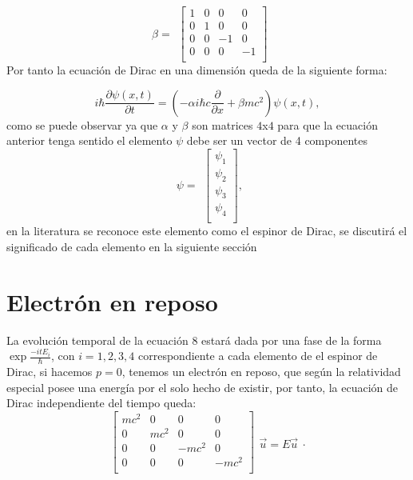 \documentclass[twocolumn]{article}
\begin{document}
\begin{equation}
\begin{matrix}
\beta=
\end{matrix}
\begin{bmatrix}
1 & 0 & 0 & 0 \\
0 & 1 & 0 & 0 \\
0 & 0 & -1 & 0 \\
0 & 0 & 0 & -1 \\
\end{bmatrix}
\end{equation}
Por tanto la ecuación de Dirac en una dimensión queda de la siguiente forma:

\begin{equation}
    i\hbar \frac{\partial \psi(x,t)}{\partial t}=(-\alpha i\hbar c\frac{\partial}{\partial x} + \beta mc^2)\psi(x,t) ,
\end{equation}
como se puede observar ya que $\alpha$ y $\beta$ son matrices $4$x$4$ para que la ecuación anterior tenga sentido el elemento $\psi$ debe ser un vector de 4 componentes 
\begin{equation}
\begin{matrix}
\psi=
\end{matrix}
\begin{bmatrix}
\psi_1 \\
\psi_2 \\
\psi_3 \\
\psi_4 \\
\end{bmatrix}
,
\end{equation}
en la literatura se reconoce este elemento como el espinor de Dirac, se discutirá el significado de cada elemento en la siguiente sección

\section{Electrón en reposo}
La evolución temporal de la ecuación $8$ estará dada por una fase de la forma $\exp \frac{-itE_i}{\hbar}$, con $i=1,2,3,4$ correspondiente a cada elemento de el espinor de Dirac, si hacemos $p=0$, tenemos un electrón en reposo, que según la relatividad especial posee una energía por el solo hecho de existir, por tanto, la ecuación de Dirac independiente del tiempo queda:
\begin{equation}
\begin{bmatrix}
mc^2 & 0 & 0 & 0 \\
0 & mc^2 & 0 & 0 \\
0 & 0 & -mc^2 & 0 \\
0 & 0 & 0 & -mc^2 \\
\end{bmatrix}
\begin{matrix}
\Vec{u}=E\Vec{u}
\end{matrix}
.
\end{equation}
\end{document}
